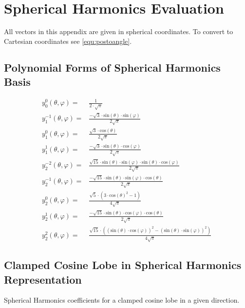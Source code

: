 \documentclass[thesis.tex]{subfiles}
\begin{document}
\section{Spherical Harmonics Evaluation} 
All vectors in this appendix are given in spherical coordinates.
To convert to Cartesian coordinates see \autoref{equ:postoangle}.

\subsection{Polynomial Forms of Spherical Harmonics Basis}
\begin{align}
y^0_0(\theta, \varphi) =& \frac{1}{2\cdot \sqrt{\pi }} \\
y^{-1}_1(\theta, \varphi) =& \frac{-\sqrt{3}\cdot \mathrm{sin}\left( \theta\right) \cdot \mathrm{sin}\left( \varphi\right) }{2 \sqrt{\pi }} \\
y^0_1(\theta, \varphi) =& \frac{\sqrt{3}\cdot \mathrm{cos}\left( \theta\right) }{2 \sqrt{\pi }} \\
y^1_1(\theta, \varphi) =& \frac{-\sqrt{3}\cdot \mathrm{sin}\left( \theta\right) \cdot \mathrm{cos}\left( \varphi\right) }{2 \sqrt{\pi }} \\
y^{-2}_2(\theta, \varphi) =& \frac{\sqrt{15}\cdot \mathrm{sin}\left( \theta\right) \cdot \mathrm{sin}\left( \varphi\right) \cdot \mathrm{sin}\left( \theta\right) \cdot \mathrm{cos}\left( \varphi\right) }{2 \sqrt{\pi }} \\
y^{-1}_2(\theta, \varphi) =& \frac{-\sqrt{15}\cdot \mathrm{sin}\left( \theta\right) \cdot \mathrm{sin}\left( \varphi\right) \cdot \mathrm{cos}\left( \theta\right) }{2 \sqrt{\pi }} \\
y^0_2(\theta, \varphi) =& \frac{\sqrt{5}\cdot \left( 3\cdot {{\mathrm{cos}\left( \theta\right) }^{2}}-1\right) }{4 \sqrt{\pi }} \\
y^{1}_2(\theta, \varphi) =& \frac{-\sqrt{15}\cdot \mathrm{sin}\left( \theta\right) \cdot \mathrm{cos}\left( \varphi\right) \cdot \mathrm{cos}\left( \theta\right) }{2 \sqrt{\pi }} \\
y^{2}_2(\theta, \varphi) =& \frac{\sqrt{15}\cdot \left( {{\left( \mathrm{sin}\left( \theta\right) \cdot \mathrm{cos}\left( \varphi\right) \right) }^{2}}-{{\left( \mathrm{sin}\left( \theta\right) \cdot \mathrm{sin}\left( \varphi\right) \right) }^{2}}\right) }{4 \sqrt{\pi }}
\end{align}

\newpage

\subsection{Clamped Cosine Lobe in Spherical Harmonics Representation} \label{chap:shcosinelobe}
Spherical Harmonics coefficients for a clamped cosine lobe in a given direction.
\end{document}
